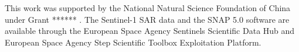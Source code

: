 \documentclass{article}
\begin{document}
This work was supported by the National Natural Science Foundation of China under Grant ****** . The Sentinel-1 SAR data and the SNAP 5.0 software are available through the European Space Agency Sentinels Scientiﬁc Data Hub and European Space Agency Step Scientific Toolbox Exploitation Platform.




\end{document}
